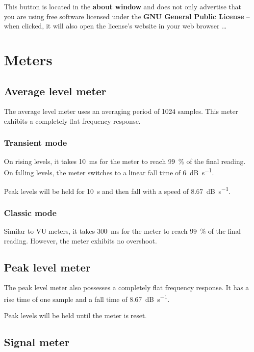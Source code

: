 This button is located in the \textbf{about window} and does not only
advertise that you are using free software licensed under the
\textbf{GNU General Public License} -- when clicked, it will also open
the license's website in your web browser \dots

\chapter{Meters}
\label{chap:meters}

\section{Average level meter}

The average level meter uses an averaging period of \num{1024}
samples.  This meter exhibits a completely flat frequency response.

\subsection{Transient mode}

On rising levels, it takes \SI{10}{\milli\second} for the meter to
reach \SI{99}{\percent} of the final reading.  On falling levels, the
meter switches to a linear fall time of \SI{6}{\dB\per\second}.

Peak levels will be held for \SI{10}{\second} and then fall with a
speed of \SI{8.67}{\dB\per\second}.

\subsection{Classic mode}

Similar to VU meters, it takes \SI{300}{\milli\second} for the meter
to reach \SI{99}{\percent} of the final reading.  However, the meter
exhibits no overshoot.

\section{Peak level meter}

The peak level meter also possesses a completely flat frequency
response.  It has a rise time of one sample and a fall time of
\SI{8.67}{\dB\per\second}.

Peak levels will be held until the meter is reset.

\section{Signal meter}

